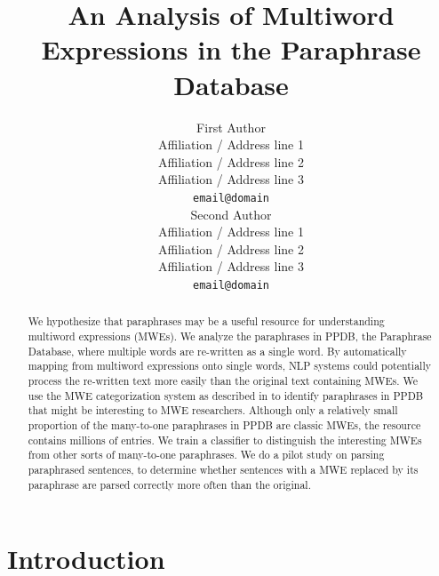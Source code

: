 \documentclass[11pt]{article}
\title{An Analysis of Multiword Expressions in the Paraphrase Database}
\author{First Author \\
  Affiliation / Address line 1 \\
  Affiliation / Address line 2 \\
  Affiliation / Address line 3 \\
  {\tt email@domain} \\\And
  Second Author \\
  Affiliation / Address line 1 \\
  Affiliation / Address line 2 \\
  Affiliation / Address line 3 \\
  {\tt email@domain} \\}
\date{}
\begin{document}
\maketitle
\begin{abstract}
We hypothesize that paraphrases may be a useful resource for understanding multiword expressions (MWEs).  We analyze the paraphrases in PPDB, the Paraphrase Database, where multiple words are re-written as a single word.  By automatically mapping from multiword expressions onto single words, NLP systems could potentially process the re-written text more easily than the original text containing MWEs. We use the MWE categorization system as described in  to identify paraphrases in PPDB that might be interesting to MWE researchers.  Although only a relatively small proportion of the many-to-one paraphrases in PPDB are classic MWEs, the resource contains millions of entries.  We train a classifier to distinguish the interesting MWEs from other sorts of many-to-one paraphrases. We do a pilot study on parsing paraphrased sentences, to determine whether sentences with a MWE replaced by its paraphrase are parsed correctly more often than the original.

\end{abstract}

\section{Introduction}
\label{intro}

%
% 
\end{document}
